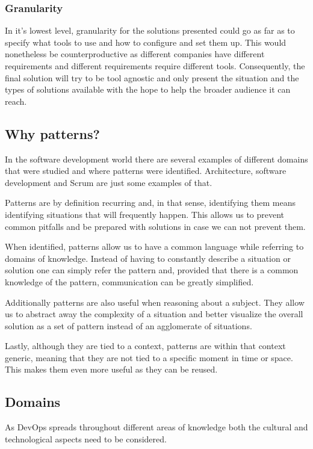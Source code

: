        \subsubsection{Granularity}
        In it's lowest level, granularity for the solutions presented could go as far as to specify what tools to use and how to configure and set them up. This would nonetheless be counterproductive as different companies have different requirements and different requirements require different tools. Consequently, the final solution will try to be tool agnostic and only present the situation and the types of solutions available with the hope to help the broader audience it can reach.
        \subsection{Why patterns?}
        In the software development world there are several examples of different domains that were studied and where patterns were identified. Architecture, software development and Scrum are just some examples of that.

        Patterns are by definition recurring and, in that sense, identifying them means identifying situations that will frequently happen. This allows us to prevent common pitfalls and be prepared with solutions in case we can not prevent them.

        When identified, patterns allow us to have a common language while referring to domains of knowledge. Instead of having to constantly describe a situation or solution one can simply refer the pattern and, provided that there is a common knowledge of the pattern, communication can be greatly simplified.

        Additionally patterns are also useful when reasoning about a subject. They allow us to abstract away the complexity of a situation and better visualize the overall solution as a set of pattern instead of an agglomerate of situations.

        Lastly, although they are tied to a context, patterns are within that context generic, meaning that they are not tied to a specific moment in time or space. This makes them even more useful as they can be reused.
        \subsection{Domains}

        As DevOps spreads throughout different areas of knowledge both the cultural and technological aspects need to be considered.

